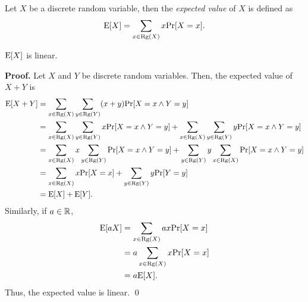 Let $X$ be a discrete random variable, then the \textit{expected value} of $X$ is defined as 
\[\mathrm{E}[X] = \sum_{x \in \mathrm{Rg}(X)} x\mathrm{Pr}[X = x].\]
\begin{theorem}
    \(\mathrm{E}[X]\) is linear. 
\end{theorem}
\textbf{Proof. } Let $X$ and $Y$ be discrete random variables. Then, the expected value of $X + Y$ is
\begin{align*}
    \mathrm{E}[X + Y] &= \sum_{x \in \mathrm{Rg}(X)} \sum_{y \in \mathrm{Rg}(Y)} (x + y)\mathrm{Pr}[X = x \wedge Y = y] \\
    &= \sum_{x \in \mathrm{Rg}(X)} \sum_{y \in \mathrm{Rg}(Y)} x\mathrm{Pr}[X = x \wedge Y = y] + \sum_{x \in \mathrm{Rg}(X)} \sum_{y \in \mathrm{Rg}(Y)} y\mathrm{Pr}[X = x \wedge Y = y] \\
    &= \sum_{x \in \mathrm{Rg}(X)} x\sum_{y \in \mathrm{Rg}(Y)} \mathrm{Pr}[X = x \wedge Y = y] + \sum_{y \in \mathrm{Rg}(Y)} y\sum_{x \in \mathrm{Rg}(X)} \mathrm{Pr}[X = x \wedge Y = y] \\
    &= \sum_{x \in \mathrm{Rg}(X)} x\mathrm{Pr}[X = x] + \sum_{y \in \mathrm{Rg}(Y)} y\mathrm{Pr}[Y = y] \\
    &= \mathrm{E}[X] + \mathrm{E}[Y].
\end{align*}
Similarly, if $a \in \mathbb{R}$,
\begin{align*}
    \mathrm{E}[aX] &= \sum_{x \in \mathrm{Rg}(X)} ax\mathrm{Pr}[X = x] \\
    &= a\sum_{x \in \mathrm{Rg}(X)} x\mathrm{Pr}[X = x] \\
    &= a\mathrm{E}[X].  
\end{align*}
Thus, the expected value is linear. \qed \par

